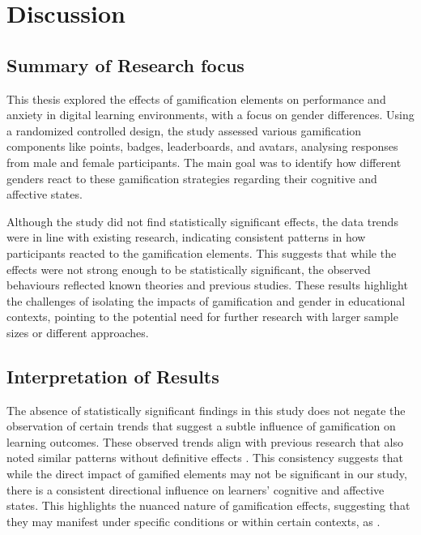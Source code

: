 \section{Discussion}
\subsection{Summary of Research focus}
This thesis explored the effects of gamification elements on performance and anxiety in digital learning environments, with a focus on gender differences.
Using a randomized controlled design, the study assessed various gamification components like points, badges, leaderboards, and avatars, analysing responses from male and female participants.
The main goal was to identify how different genders react to these gamification strategies regarding their cognitive and affective states.

Although the study did not find statistically significant effects, the data trends were in line with existing research, indicating consistent patterns in how participants reacted to the gamification elements.
This suggests that while the effects were not strong enough to be statistically significant, the observed behaviours reflected known theories and previous studies.
These results highlight the challenges of isolating the impacts of gamification and gender in educational contexts, pointing to the potential need for further research with larger sample sizes or different approaches.
\subsection{Interpretation of Results}
The absence of statistically significant findings in this study does not negate the observation of certain trends that suggest a subtle influence of gamification on learning outcomes.
These observed trends align with previous research that also noted similar patterns without definitive effects \parencite{dehghanzadehUsingGamificationSupport2024,hamariDoesGamificationWork2014}.
This consistency suggests that while the direct impact of gamified elements may not be significant in our study, there is a consistent directional influence on learners' cognitive and affective states.
This highlights the nuanced nature of gamification effects, suggesting that they may manifest under specific conditions or within certain contexts, as \textcite{dehghanzadehUsingGamificationSupport2024,koivistoRiseMotivationalInformation2019,oliveiraTailoredGamificationEducation2023}.

